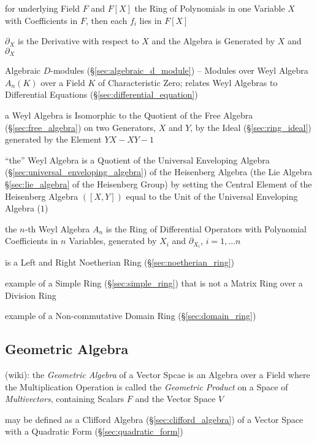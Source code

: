 for underlying Field $F$ and $F[X]$ the Ring of Polynomials in one Variable $X$
with Coefficients in $F$, then each $f_i$ lies in $F[X]$

$\partial_X$ is the Derivative with respect to $X$ and the Algebra is Generated
by $X$ and $\partial_X$

\fist Algebraic $D$-modules (\S\ref{sec:algebraic_d_module}) -- Modules over
Weyl Algebra $A_n(K)$ over a Field $K$ of Characteristic Zero; relates Weyl
Algebras to Differential Equations (\S\ref{sec:differential_equation})

a Weyl Algebra is Isomorphic to the Quotient of the Free Algebra
(\S\ref{sec:free_algebra}) on two Generators, $X$ and $Y$, by the Ideal
(\S\ref{sec:ring_ideal}) generated by the Element $YX - XY - 1$

``the'' Weyl Algebra is a Quotient of the Universal Enveloping Algebra
(\S\ref{sec:universal_enveloping_algebra}) of the Heisenberg Algebra (the Lie
Algebra \S\ref{sec:lie_algebra} of the Heisenberg Group) by setting the Central
Element of the Heisenberg Algebra $([X,Y])$ equal to the Unit of the Universal
Enveloping Algebra ($1$)

the $n$-th Weyl Algebra $A_n$ is the Ring of Differential Operators with
Polynomial Coefficients in $n$ Variables, generated by $X_i$ and
$\partial_{X_i}$, $i = 1, \ldots n$

is a Left and Right Noetherian Ring (\S\ref{sec:noetherian_ring})

example of a Simple Ring (\S\ref{sec:simple_ring}) that is not a Matrix Ring
over a Division Ring

example of a Non-commutative Domain Ring (\S\ref{sec:domain_ring})



\subsection{Geometric Algebra}\label{sec:geometric_algebra}

(wiki): the \emph{Geometric Algebra} of a Vector Spcae is an Algebra over a
Field where the Multiplication Operation is called the \emph{Geometric Product}
on a Space of \emph{Multivectors}, containing Scalars $F$ and the Vector Space
$V$

may be defined as a Clifford Algebra (\S\ref{sec:clifford_algebra}) of a Vector
Space with a Quadratic Form (\S\ref{sec:quadratic_form})

